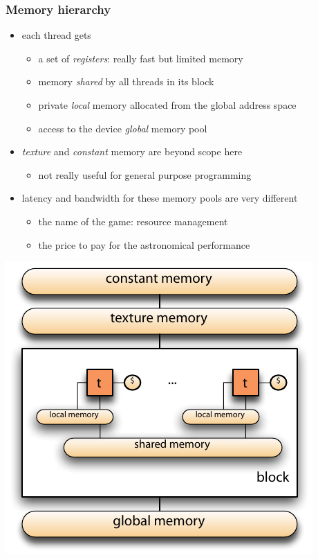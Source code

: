 \begin{frame}[fragile]
%
  \frametitle{Memory hierarchy}
%
  \begin{minipage}{.55\linewidth}
    \begin{itemize}
    \item each thread gets
      \begin{itemize}
      \item a set of {\em registers}: really fast but limited memory
      \item memory {\em shared} by all threads in its block
      \item private {\em local} memory allocated from the global address space
      \item access to the device {\em global} memory pool
      \end{itemize}
    \item {\em texture} and {\em constant} memory are beyond scope here
      \begin{itemize}
      \item not really useful for general purpose programming
      \end{itemize}
    \item latency and bandwidth for these memory pools are very different
      \begin{itemize}
      \item the name of the game: resource management
      \item the price to pay for the astronomical performance
      \end{itemize}
    \end{itemize}
  \end{minipage}
  \hfill
  \begin{minipage}{.40\linewidth}
    \includegraphics[scale=0.65]{figures/cuda-blocks.pdf}
  \end{minipage}
%
\end{frame}

